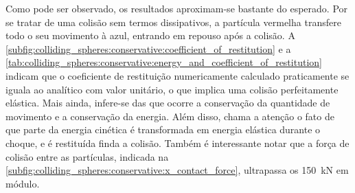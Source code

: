 Como pode ser observado, os resultados aproximam-se bastante do esperado. Por se tratar de uma colisão sem termos dissipativos, a partícula vermelha transfere todo o seu movimento à azul, entrando em repouso após a colisão. A \cref{subfig:colliding_spheres:conservative:coefficient_of_restitution} e a \cref{tab:colliding_spheres:conservative:energy_and_coefficient_of_restitution} indicam que o coeficiente de restituição numericamente calculado praticamente se iguala ao analítico com valor unitário, o que implica uma colisão perfeitamente elástica. Mais ainda, infere-se das   que ocorre a conservação da quantidade de movimento e a conservação da energia. Além disso, chama a atenção o fato de que parte da energia cinética é transformada em energia elástica durante o choque, e é restituída finda a colisão. Também é interessante notar que a força de colisão entre as partículas, indicada na \cref{subfig:colliding_spheres:conservative:x_contact_force}, ultrapassa os \SI{150}{\kilo\newton} em módulo.

